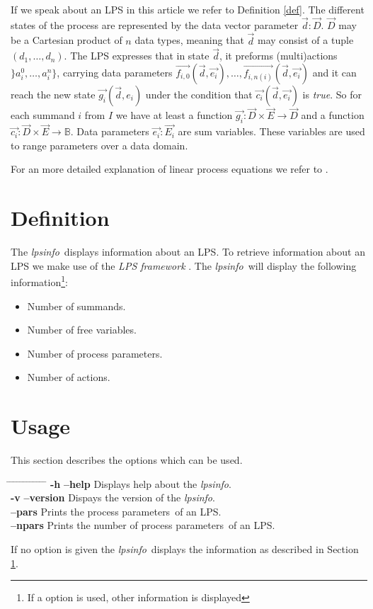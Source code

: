\documentclass[a4paper,10pt]{article}
\theoremstyle{plain}
\theoremstyle{definition}
\newcommand{\lps}{linear process equation}
\newcommand{\tool}{\textit{lpsinfo}}
\newcommand{\ti}{\textit}
\newcommand{\tb}{\textbf}
\newcommand{\ovr}{\overrightarrow}
\newcommand{\pps}{process parameters}
\newcommand{\framework}{\textit{LPS framework} \cite{LPSframework}}
\newcommand{\tab}{\hspace*{5.mm} \= \hspace*{5.mm} \= \hspace*{5.mm} \= \hspace*{5.mm} \= \hspace*{5.mm} \= \hspace*{5.mm}  \= \hspace*{5.mm}  \= \hspace*{5.mm}  \= \hspace*{5.mm} \= \hspace*{5.mm} \= \hspace*{5.mm}  \= \hspace*{5.mm}  \= \hspace*{5.mm}\kill}
\begin{document}
\noindent If we speak about an LPS in this article we refer to Definition \ref{def}.  The different states 
of the process are represented by the data vector parameter $\ovr{d}:\ovr{D}$. $\ovr{D}$ may be a Cartesian product of $n$ data types, meaning that $\ovr{d}$ may consist of a tuple $(d_1, \ldots, d_n)$. The LPS expresses that in state $\ovr{d}$, it preforms (multi)actions $\rbrace a_i^0, \ldots , a_i^n \rbrace$, carrying data parameters $\ovr{f_{i,0}}(\ovr{d},\ovr{e_i}), \ldots , \ovr{f_{i,n(i)}}(\ovr{d},\ovr{e_i})$ and 
it can reach the new state $\ovr{g_i}(\ovr{d},e_i)$ under the condition that $\ovr{c_i}(\ovr{d},\ovr{e_i})$ is \ti{true}. So for each summand $i$ from $I$ we have at least a function $\ovr{g_i}: \ovr{D} \times \ovr{E} \rightarrow \ovr{D}$ and a function $\ovr{c_i}: \ovr{D} \times \ovr{E} \rightarrow \mathbb{B}$.
Data parameters $\ovr{e_i} : \ovr{E_i}$ are sum variables. These variables are used to range parameters over a data domain. 

\noindent For an more detailed explanation of \lps s  we refer to \cite{LPS_info}.

\section{Definition}\label{Def}
The \tool\ displays information about an LPS. To retrieve information about an LPS we make use of the \framework .  The \tool\ will display the following information\footnote{If a option is used, other information is displayed}:
\begin{itemize}
\item Number of summands.
\item Number of free variables.
\item Number of process parameters.
\item Number of actions.
\end{itemize}

\section{Usage}
This section describes the options which can be used.
\begin{tabbing}
\tab
\> \tb{-h} \> \> \tb{--help} \> \> \> Displays help about the \tool .\\
\> \tb{-v} \> \> \tb{--version} \> \> \> Dispays the version of the \tool .\\
\>         \> \> \tb{--pars} \> \> \> Prints the \pps\ of an LPS.\\
\>         \> \> \tb{--npars} \> \> \> Prints the number of \pps\ of an LPS.\\
\end{tabbing}
If no option is given the \tool\ displays the information as described in Section \ref{Def}.
\end{document}
